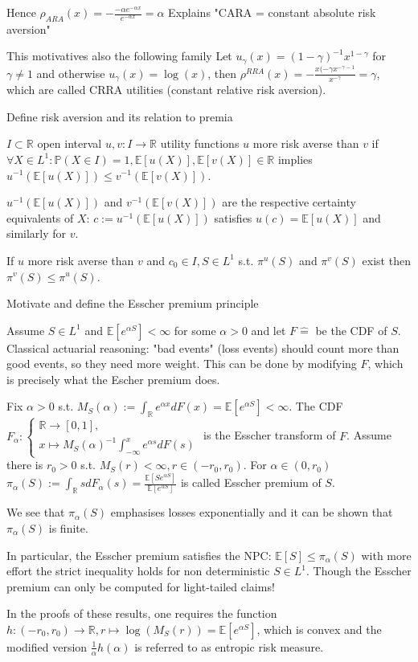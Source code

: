\documentclass[11pt,a4paper,twoside]{article}
\begin{document}
Hence
\(\rho_{ARA}(x) = -\frac{-\alpha e^{-\alpha x}}{e^{-\alpha x}} = \alpha\)
Explains "CARA = constant absolute risk aversion"

This motivatives also the following family
Let \( u_\gamma(x) = (1 - \gamma)^{-1}x^{1 - \gamma} \) for \( \gamma \neq 1 \) and otherwise \( u_\gamma(x) = \log(x) \),
then \( \rho^{RRA}(x) = - \frac{x(-\gamma x^{-\gamma - 1}}{x^{-\gamma}} = \gamma\),
which are called CRRA utilities (constant relative risk aversion).


Define risk aversion and its relation to premia

\(I \subset \mathbb{R}\) open interval
\(u, v: I \rightarrow \mathbb{R}\) utility functions
\(u\) more risk averse than \(v\) if
\(\forall X \in L^1: \mathbb{P}(X \in I) = 1, \mathbb{E}[u(X)], \mathbb{E}[v(X)] \in \mathbb{R}\)
implies
\(u^{-1}(\mathbb{E}[u(X)]) \le v^{-1}(\mathbb{E}[v(X)]).\)

\(u^{-1}(\mathbb{E}[u(X)])\) and \(v^{-1}(\mathbb{E}[v(X)])\) are the respective certainty equivalents of \(X\):
\(c := u^{-1}(\mathbb{E}[u(X)])\) satisfies \(u(c) = \mathbb{E}[u(X)]\)
and similarly for \(v\).

If \(u\) more risk averse than \(v\) and
\(c_0 \in I, S \in L^1\) s.t. \(\pi^u(S)\) and \(\pi^v(S)\) exist then \(\pi^v(S) \le \pi^u(S)\).

Motivate and define the Esscher premium principle

Assume \(S \in L^1\) and \(\mathbb{E}[e^{\alpha S}] < \infty\) for some \(\alpha > 0\)
and let \(F \hat{=}\) be the CDF of \(S\).
Classical actuarial reasoning: "bad events" (loss events) should count more than good events,
so they need more weight. This can be done by modifying \( F \), which is precisely what the
Escher premium does.


Fix \(\alpha > 0\) s.t. \(M_S(\alpha) := \int_{\mathbb{R}} e^{\alpha x} dF(x) = \mathbb{E}[e^{\alpha S}] < \infty\). 
The CDF
\(F_\alpha: \begin{cases} \mathbb{R} \rightarrow [0, 1], \\ x \mapsto M_S(\alpha)^{-1} \int_{-\infty}^x e^{\alpha s} dF(s) \end{cases}\)
is the Esscher transform of \(F\).
Assume there is \(r_0 > 0\) s.t. \(M_S(r) < \infty, r \in (-r_0, r_0)\). For \(\alpha \in (0, r_0)\)
\(\pi_\alpha(S) := \int_{\mathbb{R}} s dF_\alpha(s) = \frac{\mathbb{E}[Se^{\alpha S}]}{\mathbb{E}[e^{\alpha S}]}\)
is called Esscher premium of \(S\).

We see that \( \pi_\alpha(S) \) emphasises losses exponentially
and it can be shown that \( \pi_\alpha(S) \) is finite.

In particular, the Esscher premium satisfies the NPC: 
\( \mathbb{E}[S] \leq \pi_\alpha(S) \)
with more effort the strict inequality holds for non deterministic \( S \in L^1 \).
Though the Esscher premium can only be computed for light-tailed claims!

In the proofs of these results, one requires the function \( h : (-r_0, r_{0}) \to \mathbb{R}, r \mapsto \log(M_S(r)) = \mathbb{E}[e^{\alpha S}]\),
which is convex and the modified version \( \frac{1}{\alpha}h(\alpha) \) is referred to as entropic risk measure.
\end{document}
